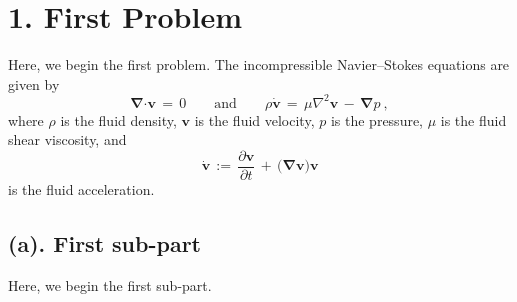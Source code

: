\documentclass[11pt]{article}
\newcommand{\bmcdot}{\bm{\cdot}}
\newcommand{\bmnabla}{\bm{\nabla}}
\newcommand{\bmv}{\bm{v}}
\newcommand{\bmvdot}{\bm{\dot{v}}}
\begin{document}
%
%

\section*{1. First Problem}

Here, we begin the first problem.
The incompressible Navier--Stokes equations are given by
\begin{equation}
	\bmnabla \bmcdot \bmv
	\, = \, 0
	\qquad
	\text{and}
	\qquad
	\rho \bmvdot
	\, = \, \mu \nabla^2 \bmv
	\, - \, \bmnabla p
	~,
\end{equation}
where $\rho$ is the fluid density, $\bmv$ is the fluid velocity, $p$ is the pressure, $\mu$ is the fluid shear viscosity, and 
\begin{equation}
	\bmvdot
	\, := \, \dfrac{\partial \bmv}{\partial t}
	\, + \, \big( \bmnabla \bmv \big) \bmv
\end{equation}
is the fluid acceleration.



%
%

\subsection*{(a). First sub-part}

Here, we begin the first sub-part.
\end{document}

